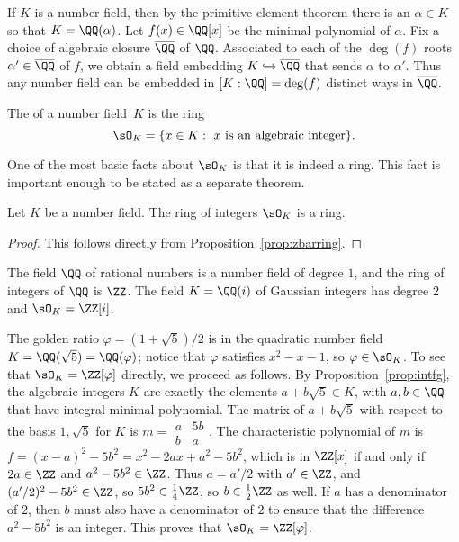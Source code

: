 If $K$ is a number field, then by the primitive element theorem there
is an $\alpha \in K$ so that $K = \QQ(\alpha)$.  Let $f(x) \in \QQ[x]$
be the minimal polynomial of $\alpha$.  Fix a choice of algebraic
closure $\overline{\QQ}$ of $\QQ$.  Associated to each of the $\deg(f)$ roots
$\alpha'\in\overline{\QQ}$ of $f$, we obtain a field embedding $K \hookrightarrow \overline{\QQ}$
that sends $\alpha$ to $\alpha'$.  Thus any number field can be
embedded in $[K:\QQ]=\deg(f)$ distinct ways in $\overline{\QQ}$.

\begin{definition}
  The  of a number field~$K$ is the ring
  $$
    \sO_K = \{x \in K : \text{ $x$ is an algebraic integer}\}.
  $$
\end{definition}

One of the most basic facts about $\sO_K$ is that it is indeed a ring.
This fact is important enough to be stated as a separate theorem.

\begin{theorem}
  Let $K$ be a number field.
  The ring of integers $\sO_K$ is a ring.
\end{theorem}
\begin{proof}
  This follows directly from Proposition~\ref{prop:zbarring}.
\end{proof}


\begin{example}
  The field $\QQ$ of rational numbers is a number field of degree $1$,
  and the ring of integers of $\QQ$ is $\ZZ$.  The field $K=\QQ(i)$ of
  Gaussian integers has degree $2$ and $\sO_K = \ZZ[i]$.
\end{example}

\begin{example}\label{example:Qsqrt5ringofints}
  The golden ratio $\varphi =(1+\sqrt{5})/2$ is in the quadratic
  number field $K=\QQ(\sqrt{5})=\QQ(\varphi)$; notice that
  $\varphi$ satisfies $x^2-x-1$, so $\varphi\in\sO_K$.
  To see that $\sO_K = \ZZ[\varphi]$ directly, we proceed as follows.
  By Proposition~\ref{prop:intfg}, the algebraic integers $K$
  are exactly the elements $a+b\sqrt{5} \in K$, with $a,b\in\QQ$
  that have integral minimal polynomial. The matrix of $a+b\sqrt{5}$
  with respect to the basis $1,\sqrt{5}$ for $K$ is
  $m=\begin{smallmatrix} a & 5b \\ b & a \end{smallmatrix}$.
  The characteristic polynomial of $m$ is
  $f = (x-a)^2 - 5b^2 = x^2 - 2ax + a^2 - 5b^2$, which is in $\ZZ[x]$
  if and only if $2a\in\ZZ$ and $a^2-5b^2\in\ZZ$. Thus $a=a'/2$ with
  $a'\in\ZZ$, and $(a'/2)^2 - 5b^2 \in\ZZ$, so $5b^2 \in \frac{1}{4}\ZZ$,
  so $b\in\frac{1}{2}\ZZ$ as well. If $a$ has a denominator of $2$,
  then $b$ must also have a denominator of $2$ to ensure that the
  difference $a^2-5b^2$ is an integer. This proves that
  $\sO_K = \ZZ[\varphi]$.
\end{example}

